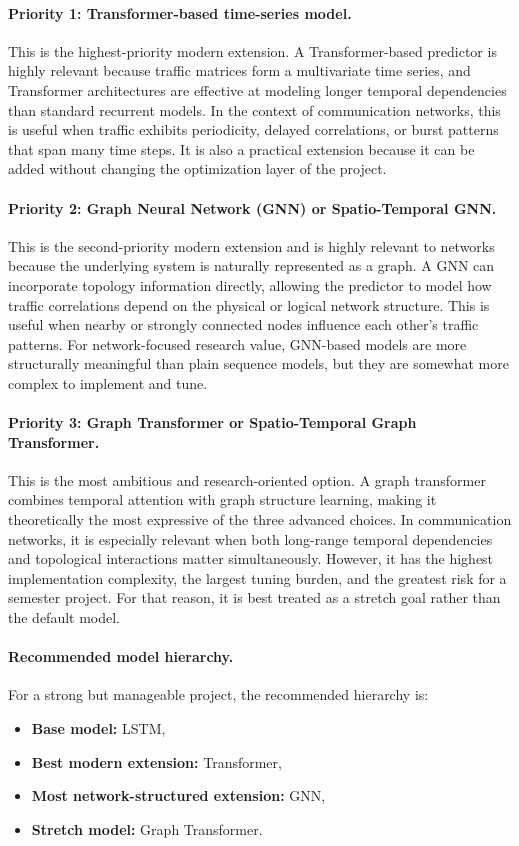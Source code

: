\documentclass[11pt]{article}
\begin{document}
\paragraph{Priority 1: Transformer-based time-series model.}
This is the highest-priority modern extension. A Transformer-based predictor is highly relevant because traffic matrices form a multivariate time series, and Transformer architectures are effective at modeling longer temporal dependencies than standard recurrent models. In the context of communication networks, this is useful when traffic exhibits periodicity, delayed correlations, or burst patterns that span many time steps. It is also a practical extension because it can be added without changing the optimization layer of the project.

\paragraph{Priority 2: Graph Neural Network (GNN) or Spatio-Temporal GNN.}
This is the second-priority modern extension and is highly relevant to networks because the underlying system is naturally represented as a graph. A GNN can incorporate topology information directly, allowing the predictor to model how traffic correlations depend on the physical or logical network structure. This is useful when nearby or strongly connected nodes influence each other's traffic patterns. For network-focused research value, GNN-based models are more structurally meaningful than plain sequence models, but they are somewhat more complex to implement and tune.

\paragraph{Priority 3: Graph Transformer or Spatio-Temporal Graph Transformer.}
This is the most ambitious and research-oriented option. A graph transformer combines temporal attention with graph structure learning, making it theoretically the most expressive of the three advanced choices. In communication networks, it is especially relevant when both long-range temporal dependencies and topological interactions matter simultaneously. However, it has the highest implementation complexity, the largest tuning burden, and the greatest risk for a semester project. For that reason, it is best treated as a stretch goal rather than the default model.

\paragraph{Recommended model hierarchy.}
For a strong but manageable project, the recommended hierarchy is:
\begin{itemize}
    \item \textbf{Base model:} LSTM,
    \item \textbf{Best modern extension:} Transformer,
    \item \textbf{Most network-structured extension:} GNN,
    \item \textbf{Stretch model:} Graph Transformer.
\end{itemize}
\end{document}

